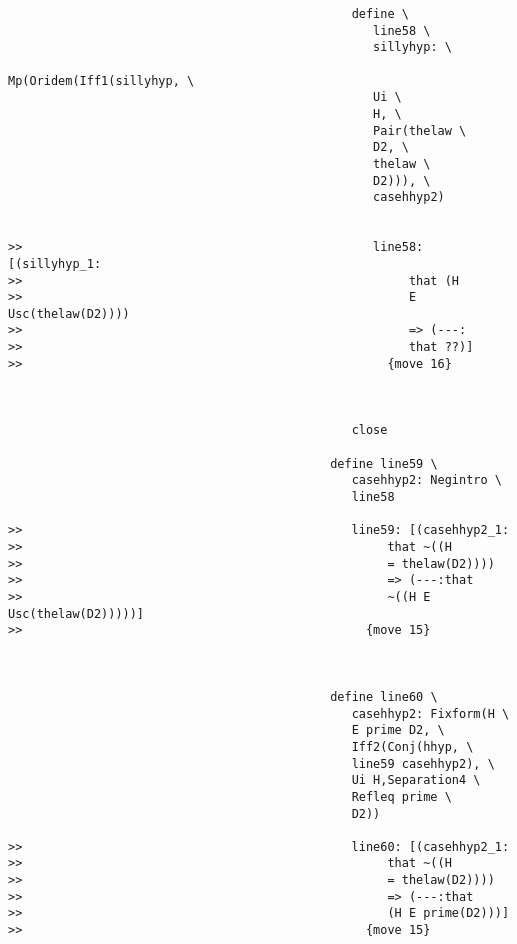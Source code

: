 \documentclass[12pt]{article}
\begin{document}
\begin{verbatim}
                                                define \
                                                   line58 \
                                                   sillyhyp: \
                                                   Mp(Oridem(Iff1(sillyhyp, \
                                                   Ui \
                                                   H, \
                                                   Pair(thelaw \
                                                   D2, \
                                                   thelaw \
                                                   D2))), \
                                                   casehhyp2)


>>                                                 line58: [(sillyhyp_1:
>>                                                      that (H
>>                                                      E Usc(thelaw(D2))))
>>                                                      => (---:
>>                                                      that ??)]
>>                                                   {move 16}



                                                close

                                             define line59 \
                                                casehhyp2: Negintro \
                                                line58

>>                                              line59: [(casehhyp2_1:
>>                                                   that ~((H
>>                                                   = thelaw(D2))))
>>                                                   => (---:that
>>                                                   ~((H E Usc(thelaw(D2)))))]
>>                                                {move 15}



                                             define line60 \
                                                casehhyp2: Fixform(H \
                                                E prime D2, \
                                                Iff2(Conj(hhyp, \
                                                line59 casehhyp2), \
                                                Ui H,Separation4 \
                                                Refleq prime \
                                                D2))

>>                                              line60: [(casehhyp2_1:
>>                                                   that ~((H
>>                                                   = thelaw(D2))))
>>                                                   => (---:that
>>                                                   (H E prime(D2)))]
>>                                                {move 15}




\end{verbatim}
\end{document}
